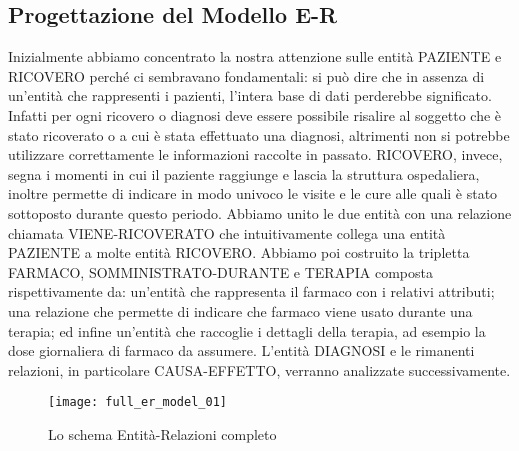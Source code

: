 \documentclass{article}
\begin{document}
\clearpage
\subsection{Progettazione del Modello E-R}
Inizialmente abbiamo concentrato la nostra attenzione sulle entità PAZIENTE e RICOVERO perché ci sembravano fondamentali: si può dire che in assenza di un'entità che rappresenti i pazienti, l'intera base di dati perderebbe significato.
Infatti per ogni ricovero o diagnosi deve essere possibile risalire al soggetto che è stato ricoverato o a cui è stata effettuato una diagnosi, altrimenti non si potrebbe utilizzare correttamente le informazioni raccolte in passato.
RICOVERO, invece, segna i momenti in cui il paziente raggiunge e lascia la struttura ospedaliera, inoltre permette di indicare in modo univoco le visite e le cure alle quali è stato sottoposto durante questo periodo.
Abbiamo unito le due entità con una relazione chiamata VIENE-RICOVERATO che intuitivamente collega una entità PAZIENTE a molte entità RICOVERO.
Abbiamo poi costruito la tripletta FARMACO, SOMMINISTRATO-DURANTE e TERAPIA composta rispettivamente da: un'entità che rappresenta il farmaco con i relativi attributi; una relazione che permette di indicare che farmaco viene usato durante una terapia; ed infine un'entità che raccoglie i dettagli della terapia, ad esempio la dose giornaliera di farmaco da assumere.
L'entità DIAGNOSI e le rimanenti relazioni, in particolare CAUSA-EFFETTO, verranno analizzate successivamente.


\begin{figure} %
  \centering
  \texttt{[image: full\_er\_model\_01]}
  \caption{Lo schema Entità-Relazioni completo}
  \label{figure_ER_01}
\end{figure}
\end{document}
